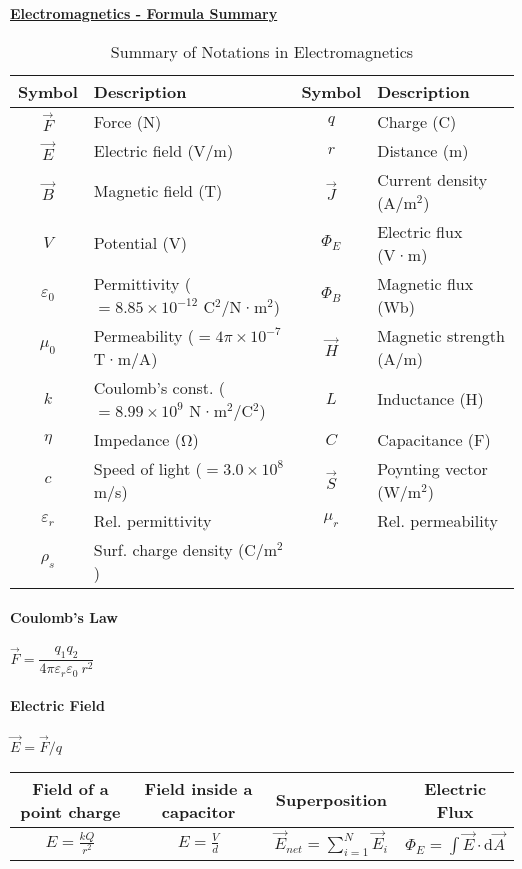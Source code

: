 \documentclass[a4paper, 11pt]{article}
\begin{document}
\underline{\Large{\textbf{Electromagnetics - Formula Summary}}} \vspace{.5cm}

\begin{table}[h!]
\centering
\begin{tabular}{@{}c l c l@{}}
\toprule
\textbf{Symbol} & \textbf{Description} & \textbf{Symbol} & \textbf{Description} \\ \midrule
$\vec{F}$ & Force (N) & $q$ & Charge (C) \\
$\vec{E}$ & Electric field (V/m) & $r$ & Distance (m) \\
$\vec{B}$ & Magnetic field (T) & $\vec{J}$ & Current density (A/m$^2$) \\
$V$ & Potential (V) & $\Phi_E$ & Electric flux (V·m) \\
$\varepsilon_0$ & Permittivity ($= 8.85 \times 10^{-12}$ C$^2$/N·m$^2$) & $\Phi_B$ & Magnetic flux (Wb) \\
$\mu_0$ & Permeability ($= 4\pi \times 10^{-7}$ T·m/A) & $\vec{H}$ & Magnetic strength (A/m) \\
$k$ & Coulomb's const. ($= 8.99\times 10^{9}$ N·m$^2$/C$^2$) & $L$ & Inductance (H) \\
$\eta$ & Impedance (Ω) & $C$ & Capacitance (F) \\
$c$ & Speed of light ($= 3.0\times 10^{8}$ m/s) & $\vec{S}$ & Poynting vector (W/m$^2$) \\
$\varepsilon_r$ & Rel. permittivity & $\mu_r$ & Rel. permeability \\
$\rho_s$ & Surf. charge density (C/m$^2$) & \\
\bottomrule
\end{tabular}
\caption{Summary of Notations in Electromagnetics}
\label{tab:notations}
\end{table}

\paragraph{Coulomb's Law} $\vec{F} = \dfrac{q_{1} q_{2}}{4 \pi \varepsilon_{r} \varepsilon_{0} \ r^{2}}$

\paragraph{Electric Field} $\vec{E} = \vec{F} / q$
\begin{table}[H]
    \centering
    \begin{tabular}{cccc}
    \toprule
    Field of a point charge &
    Field inside a capacitor &
    Superposition &
    Electric Flux \\
    \midrule
    $\displaystyle E = \frac{kQ}{r^{2}}$ &
    $\displaystyle E = \frac{V}{d}$ &
    $\displaystyle \vec{E}_{net} = \sum_{i=1}^{N}\vec{E}_{i}$ &
    $\displaystyle \Phi_{E} = \int \vec{E} \cdot \mathrm{d}\vec{A}$ \\
    \bottomrule
    \end{tabular}
\end{table}
\end{document}
